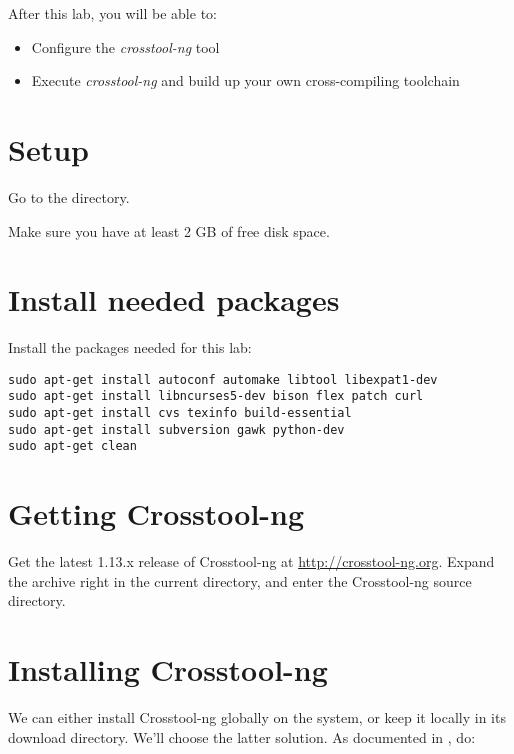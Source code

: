 
After this lab, you will be able to:

\begin{itemize}
\item Configure the {\em crosstool-ng} tool
\item Execute {\em crosstool-ng} and build up your own cross-compiling toolchain
\end{itemize}

\section{Setup}

Go to the  directory.

Make sure you have at least 2 GB of free disk space.

\section{Install needed packages}

Install the packages needed for this lab:

\begin{verbatim}
sudo apt-get install autoconf automake libtool libexpat1-dev
sudo apt-get install libncurses5-dev bison flex patch curl
sudo apt-get install cvs texinfo build-essential
sudo apt-get install subversion gawk python-dev
sudo apt-get clean
\end{verbatim}

\section{Getting Crosstool-ng}

Get the latest 1.13.x release of Crosstool-ng at
\url{http://crosstool-ng.org}. Expand the archive right in the current
directory, and enter the Crosstool-ng source directory.

\section{Installing Crosstool-ng}

We can either install Crosstool-ng globally on the system, or keep it
locally in its download directory. We'll choose the latter
solution. As documented in
, do:

